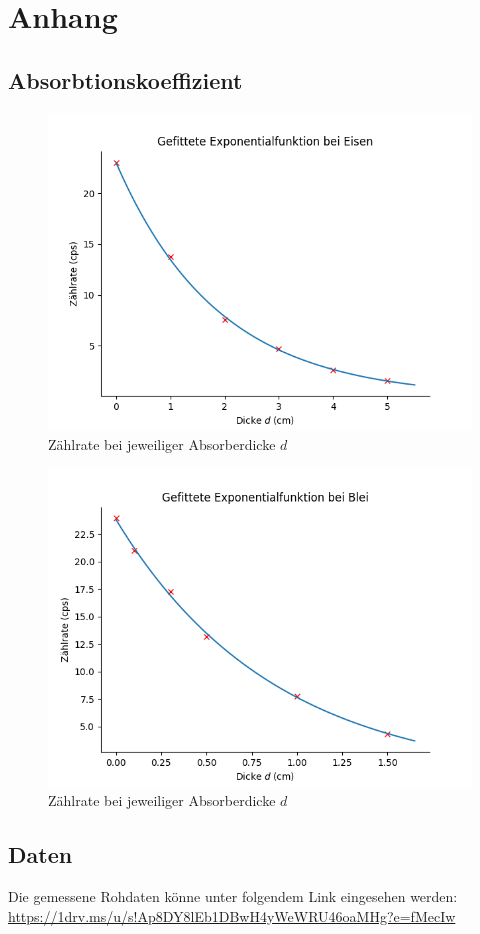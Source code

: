 

\chapter{Anhang}
\section{Absorbtionskoeffizient}

\begin{figure}[ht]
    \centering
    \includegraphics[width = 12cm]{Bilder/Auswertung/AbsorbtioskFe.png}
    \caption{Zählrate bei jeweiliger Absorberdicke $d$}
    \label{AbsorbtionkoeffFe}
\end{figure}


\begin{figure}[ht]
    \centering
    \includegraphics[width = 12cm]{Bilder/Auswertung/AbsorbtioskPb.png}
    \caption{Zählrate bei jeweiliger Absorberdicke $d$}
    \label{AbsorbtionkoeffPb}
\end{figure}




\section{Daten}
Die gemessene Rohdaten könne unter folgendem Link eingesehen werden:\\
\url{https://1drv.ms/u/s!Ap8DY8lEb1DBwH4yWeWRU46oaMHg?e=fMecIw}
